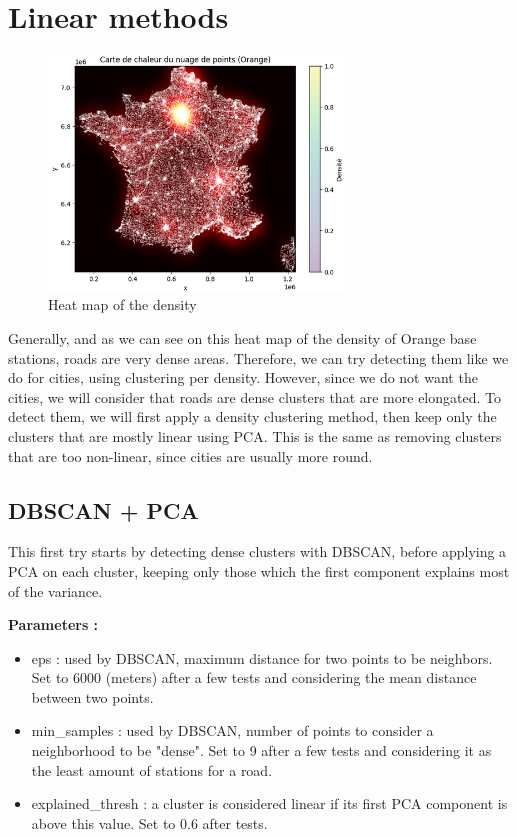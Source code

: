 \documentclass[main.tex]{subfiles}
\begin{document}
\section{Linear methods}

\begin{figure}[H]
    \centering
    \includegraphics[width=0.7\textwidth]{Images/Heatmap_density_Orange.png}
    \caption{Heat map of the density}
\end{figure}

Generally, and as we can see on this heat map of the density of Orange base stations, roads are very dense areas. Therefore, we can try detecting them like we do for cities, using clustering per density. However, since we do not want the cities, we will consider that roads are dense clusters that are more elongated. To detect them, we will first apply a density clustering method, then keep only the clusters that are mostly linear using PCA. This is the same as removing clusters that are too non-linear, since cities are usually more round. 


\subsection{DBSCAN + PCA} 

This first try starts by detecting dense clusters with DBSCAN, before applying a PCA on each cluster, keeping only those which the first component explains most of the variance.

\textbf{Parameters : }
\begin{itemize}
    \item eps : used by DBSCAN, maximum distance for two points to be neighbors. Set to 6000 (meters) after a few tests and considering the mean distance between two points.
    \item min\_samples : used by DBSCAN, number of points to consider a neighborhood to be "dense". Set to 9 after a few tests and considering it as the least amount of stations for a road.
    \item explained\_thresh : a cluster is considered linear if its first PCA component is above this value. Set to 0.6 after tests.
\end{itemize}
\end{document}
